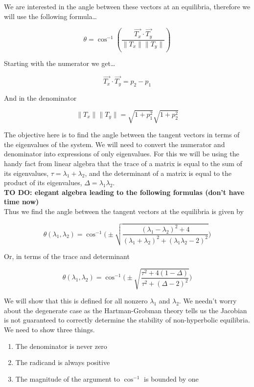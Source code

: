 \documentclass{article}
\begin{document}
We are interested in the angle between these vectors at an equilibria,
therefore we will use the following formula\ldots{}

\[\theta = \cos^{-1}(\frac{\vec{T_x}\cdot \vec{T_y}}{\|T_x\| \|T_y\|})\]

Starting with the numerator we get\ldots{}

\[\vec{T_x}\cdot \vec{T_y} = p_2-p_1\]

And in the denominator

\[\|T_x\| \|T_y\| = \sqrt{1+p^2_1}\sqrt{1+p^2_2}\]

The objective here is to find the angle between the tangent vectors in
terms of the eigenvalues of the system. We will need to convert the
numerator and denominator into expressions of only eigenvalues. For this
we will be using the handy fact from linear algebra that the trace of a
matrix is equal to the sum of its eigenvalues,
$\tau=\lambda_1+\lambda_2$, and the determinant of a matrix is equal to
the product of its eigenvalues, $\Delta = \lambda_1 \lambda_2$. \\

\textbf{TO DO: elegant algebra leading to the following formulas (don't
have time now)} \\

Thus we find the angle between the tangent vectors at the equilibria is
given by

\[\theta(\lambda_1,\lambda_2) = \cos^{-1}\Bigg (\pm \sqrt{\frac{(\lambda_1-\lambda_2)^2+4}{(\lambda_1+\lambda_2)^2+(\lambda_1 \lambda_2-2)^2}}\Bigg )\]

Or, in terms of the trace and determinant

\[\theta(\lambda_1,\lambda_2) = \cos^{-1}\Bigg (\pm \sqrt{\frac{\tau^2+4(1-\Delta)}{\tau^2+(\Delta-2)^2}}\Bigg )\]

We will show that this is defined for all nonzero $\lambda_1$ and
$\lambda_2$. We needn't worry about the degenerate case as the
Hartman-Grobman theory tells us the Jacobian is not guaranteed to
correctly determine the stability of non-hyperbolic equilibria. We need
to show three things.

\begin{enumerate}
\def\labelenumi{\arabic{enumi}.}
\itemsep1pt\parskip0pt
\item
  The denominator is never zero
\item
  The radicand is always positive
\item
  The magnitude of the argument to $\cos^{-1}$ is bounded by one
\end{enumerate}
\end{document}

